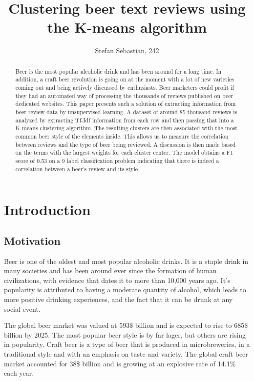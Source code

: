 \documentclass[12pt]{article}
\begin{document}
	\title{Clustering beer text reviews using the K-means algorithm}
	\author{Stefan Sebastian, 242}
	\date{}
	\maketitle
	
	\begin{abstract}
	Beer is the most popular alcoholic drink and has been around for a long time. In addition, a craft beer revolution is going on at the moment with a lot of new varieties coming out and being actively discussed by enthusiasts. Beer marketers could profit if they had an automated way of processing the thousands of reviews published on beer dedicated websites. This paper presents such a solution of extracting information from beer review data by unsupervised learning. A dataset of around 85 thousand reviews is analyzed by extracting Tf-Idf information from each row and then passing that into a K-means clustering algorithm. The resulting clusters are then associated with the most common beer style of the elements inside. This allows us to measure the correlation between reviews and the type of beer being reviewed. A discussion is then made based on the terms with the largest weights for each cluster center. The model obtains a F1 score of 0.53 on a 9 label classification problem indicating that there is indeed a correlation between a beer's review and its style.
	\end{abstract}

	\newpage
	\tableofcontents
	\newpage
	
	\section{Introduction}
	\subsection{Motivation}
	Beer is one of the oldest and most popular alcoholic drinks. It is a staple drink in many societies and has been around ever since the formation of human civilizations, with evidence that dates it to more than 10,000 years ago\cite{BeerArticleTime}. It's popularity is attributed to having a moderate quantity of alcohol, which leads to more positive drinking experiences, and the fact that it can be drunk at any social event\cite{BeerArticleTime}.
	
	The global beer market was valued at 593\$ billion and is expected to rise to 685\$ billion by 2025\cite{BeerStats}. The most popular beer style is by far lager, but others are rising in popularity. Craft beer is a type of beer that is produced in microbreweries, in a traditional style and with an emphasis on taste and variety. The global craft beer market accounted for 38\$ billion and is growing at an explosive rate of 14.1\% each year\cite{CraftBeerStats}.
	
\end{document}
